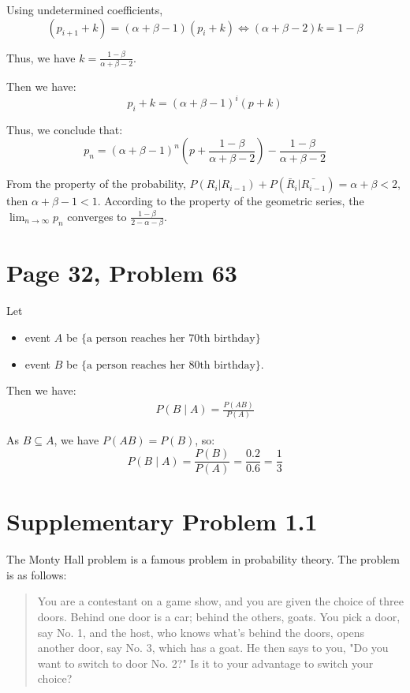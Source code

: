 \documentclass[a4paper, UTF-8]{article}
\theoremstyle{plain}
\begin{document}
Using undetermined coefficients, 
$$
(p_{i + 1} + k) = (\alpha + \beta - 1)(p_i + k) \Leftrightarrow (\alpha + \beta - 2)k = 1-\beta
$$

Thus, we have $k = \frac{1-\beta}{\alpha + \beta - 2}$.

Then we have:
$$
p_i + k = (\alpha + \beta - 1)^i (p + k)
$$

Thus, we conclude that:
$$
p_n = (\alpha + \beta - 1)^n (p + \frac{1-\beta}{\alpha + \beta - 2}) - \frac{1-\beta}{\alpha + \beta - 2}
$$

From the property of the probability, $P(R_{i}|R_{i-1}) + P(\bar{R}_{i}|\bar{R_{i-1}}) = \alpha + \beta < 2$, then $\alpha + \beta - 1 < 1$. According to the property of the geometric series, the $\lim_{n\to \infty} p_n$ converges to $\frac{1-\beta}{2 - \alpha - \beta}$.


\section{Page 32, Problem 63}

Let 
\begin{itemize}
  \item event $A$ be $\{\text{a person reaches her 70th birthday}\}$
  \item event $B$ be $\{\text{a person reaches her 80th birthday}\}$.
\end{itemize}

Then we have:
\begin{align*}
P(B\mid A) = \frac{P(AB)}{P(A)} 
\end{align*}

As $B \subseteq A$, we have $P(AB) = P(B)$, so:
$$
P(B\mid A) = \frac{P(B)}{P(A)} = \frac{0.2}{0.6} = \frac{1}{3}
$$

\section{Supplementary Problem 1.1}

The Monty Hall problem is a famous problem in probability theory. The problem is as follows:

\begin{quote}
You are a contestant on a game show, and you are given the choice of three doors. Behind one door is a car; behind the others, goats. You pick a door, say No. 1, and the host, who knows what's behind the doors, opens another door, say No. 3, which has a goat. He then says to you, "Do you want to switch to door No. 2?" Is it to your advantage to switch your choice?
\end{quote}
\end{document}
